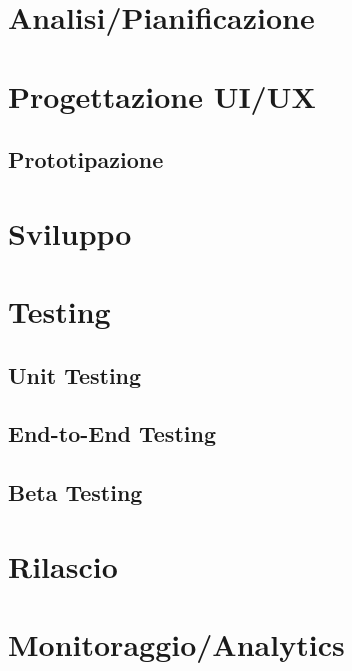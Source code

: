 


\section{Analisi/Pianificazione}

\section{Progettazione UI/UX}
\subsection{Prototipazione}

\section{Sviluppo}

\section{Testing}
\subsection{Unit Testing}
\subsection{End-to-End Testing}
\subsection{Beta Testing}

\section{Rilascio}

\section{Monitoraggio/Analytics}
